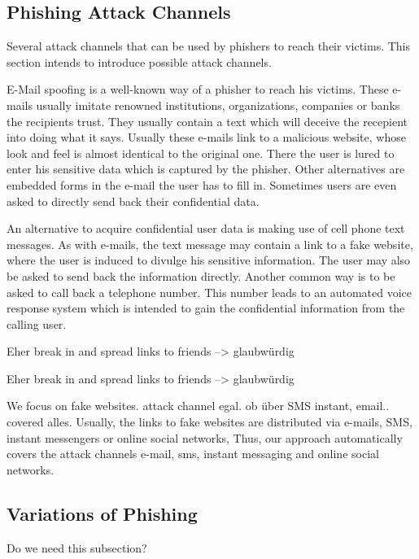 \subsection{Phishing Attack Channels}
Several attack channels that can be used by phishers to reach their victims. This section intends to introduce possible attack channels.
\label{s:attack_channels}
\begin{description}[leftmargin=0cm]
	\item[E-Mail] E-Mail spoofing is a well-known way of a phisher to reach his victims. These e-mails usually imitate renowned institutions, organizations, companies or banks the recipients trust. They usually contain a text which will deceive the recepient into doing what it says. Usually these e-mails link to a malicious website, whose look and feel is almost identical to the original one. There the user is lured to enter his sensitive data which is captured by the phisher. Other alternatives are embedded forms in the e-mail the user has to fill in. Sometimes users are even asked to directly send back their confidential data.
	\item[SMS] An alternative to acquire confidential user data is making use of cell phone text messages. As with e-mails, the text message may contain a link to a fake website, where the user is induced to divulge his sensitive information. The user may also be asked to send back the information directly. Another common way is to be asked to call back a telephone number. This number leads to an automated voice response system which is intended to gain the confidential information from the calling user.
	\item[Instant Messaging] Eher break in and spread links to friends --> glaubwürdig
	\item[Online Social Networks] Eher break in and spread links to friends --> glaubwürdig
	\item[VoIP] 
\end{description}


We focus on fake websites. attack channel egal. ob über SMS instant, email.. covered alles. Usually, the links to fake websites are distributed via e-mails, SMS, instant messengers or online social networks, Thus, our approach automatically covers the attack channels e-mail, sms, instant messaging and online social networks.

\subsection{Variations of Phishing}
\label{s:phishing_variations}
Do we need this subsection?
\begin{description}[leftmargin=3cm]
	\item[Mass Phishing]
	\item[Spear Phishing]  
	\item[Persistent Spear Phishing]
	\item[Clone Phishing]
	\item[Whaling]
\end{description}

